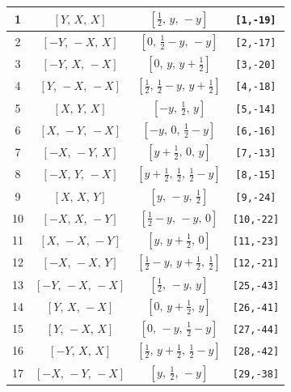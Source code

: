 \documentclass[fleqn,8pt]{jsarticle}
\begin{document}
\begin{longtable}{cccc}
1 & $\left[ Y,\, X,\, X \right]$ & $\left[ \frac{1}{2},\, y,\, - y \right]$ & {\tt [1,-19]} \\ \hline
2 & $\left[ - Y,\, - X,\, X \right]$ & $\left[ 0,\, \frac{1}{2} - y,\, - y \right]$ & {\tt [2,-17]} \\ \hline
3 & $\left[ - Y,\, X,\, - X \right]$ & $\left[ 0,\, y,\, y + \frac{1}{2} \right]$ & {\tt [3,-20]} \\ \hline
4 & $\left[ Y,\, - X,\, - X \right]$ & $\left[ \frac{1}{2},\, \frac{1}{2} - y,\, y + \frac{1}{2} \right]$ & {\tt [4,-18]} \\ \hline
5 & $\left[ X,\, Y,\, X \right]$ & $\left[ - y,\, \frac{1}{2},\, y \right]$ & {\tt [5,-14]} \\ \hline
6 & $\left[ X,\, - Y,\, - X \right]$ & $\left[ - y,\, 0,\, \frac{1}{2} - y \right]$ & {\tt [6,-16]} \\ \hline
7 & $\left[ - X,\, - Y,\, X \right]$ & $\left[ y + \frac{1}{2},\, 0,\, y \right]$ & {\tt [7,-13]} \\ \hline
8 & $\left[ - X,\, Y,\, - X \right]$ & $\left[ y + \frac{1}{2},\, \frac{1}{2},\, \frac{1}{2} - y \right]$ & {\tt [8,-15]} \\ \hline
9 & $\left[ X,\, X,\, Y \right]$ & $\left[ y,\, - y,\, \frac{1}{2} \right]$ & {\tt [9,-24]} \\ \hline
10 & $\left[ - X,\, X,\, - Y \right]$ & $\left[ \frac{1}{2} - y,\, - y,\, 0 \right]$ & {\tt [10,-22]} \\ \hline
11 & $\left[ X,\, - X,\, - Y \right]$ & $\left[ y,\, y + \frac{1}{2},\, 0 \right]$ & {\tt [11,-23]} \\ \hline
12 & $\left[ - X,\, - X,\, Y \right]$ & $\left[ \frac{1}{2} - y,\, y + \frac{1}{2},\, \frac{1}{2} \right]$ & {\tt [12,-21]} \\ \hline
13 & $\left[ - Y,\, - X,\, - X \right]$ & $\left[ \frac{1}{2},\, - y,\, y \right]$ & {\tt [25,-43]} \\ \hline
14 & $\left[ Y,\, X,\, - X \right]$ & $\left[ 0,\, y + \frac{1}{2},\, y \right]$ & {\tt [26,-41]} \\ \hline
15 & $\left[ Y,\, - X,\, X \right]$ & $\left[ 0,\, - y,\, \frac{1}{2} - y \right]$ & {\tt [27,-44]} \\ \hline
16 & $\left[ - Y,\, X,\, X \right]$ & $\left[ \frac{1}{2},\, y + \frac{1}{2},\, \frac{1}{2} - y \right]$ & {\tt [28,-42]} \\ \hline
17 & $\left[ - X,\, - Y,\, - X \right]$ & $\left[ y,\, \frac{1}{2},\, - y \right]$ & {\tt [29,-38]} \\ \hline

\end{longtable}
\end{document}
